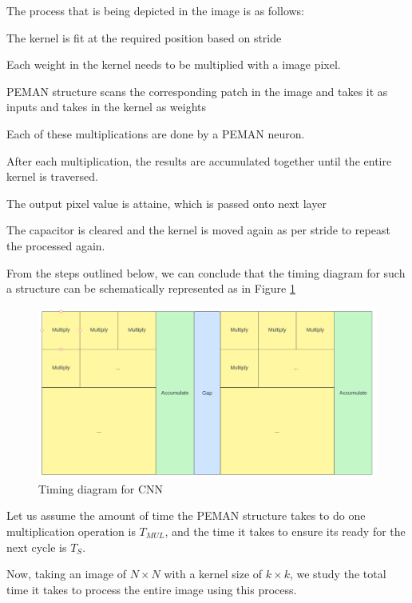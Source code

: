 \documentclass[wide]{adonis}
\begin{document}
The process that is being depicted in the image is as follows:

\begin{list}{•}{}
	\item The kernel is fit at the required position based on stride
	\item Each weight in the kernel needs to be multiplied with a image pixel.
	\item PEMAN structure scans the corresponding patch in the image and takes it as inputs and takes in the kernel as weights
	\item Each of these multiplications are done by a PEMAN neuron.
	\item After each multiplication, the results are accumulated together until the entire kernel is traversed.
	\item The output pixel value is attaine, which is passed onto next layer
	\item The capacitor is cleared and the kernel is moved again as per stride to repeast the processed again.
\end{list}

From the steps outlined below, we can conclude that the timing diagram for such a structure can be schematically represented as in Figure \ref{cnn_timing_diagram}

\begin{figure}
	\centering
	\includegraphics[width=\textwidth]{images/convTiming.png}
	\caption{Timing diagram for CNN}
	\label{cnn_timing_diagram}
\end{figure}

Let us assume the amount of time the PEMAN structure takes to do one multiplication operation is $T_{MUL}$, and the time it takes to ensure its ready for the next cycle is $T_S$.

Now, taking an image of $N\times N$ with a kernel size of $k \times k$, we study the total time it takes to process the entire image using this process.
\end{document}
